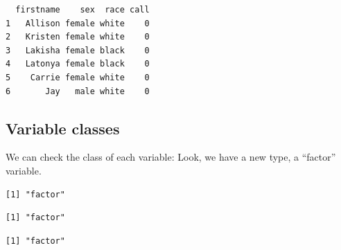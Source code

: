 \documentclass[
  letterpaper,
  DIV=11,
  numbers=noendperiod]{scrreprt}
\newenvironment{Shaded}{\begin{snugshade}}{\end{snugshade}}
\newcommand{\FunctionTok}[1]{\textcolor[rgb]{0.28,0.35,0.67}{#1}}
\newcommand{\NormalTok}[1]{\textcolor[rgb]{0.00,0.23,0.31}{#1}}
\newcommand{\SpecialCharTok}[1]{\textcolor[rgb]{0.37,0.37,0.37}{#1}}
\begin{document}
\begin{verbatim}
  firstname    sex  race call
1   Allison female white    0
2   Kristen female white    0
3   Lakisha female black    0
4   Latonya female black    0
5    Carrie female white    0
6       Jay   male white    0
\end{verbatim}

\hypertarget{variable-classes}{%
\subsection{Variable classes}\label{variable-classes}}

We can check the class of each variable: Look, we have a new type, a
``factor'' variable.

\begin{Shaded}
\end{Shaded}

\begin{verbatim}
[1] "factor"
\end{verbatim}

\begin{Shaded}
\end{Shaded}

\begin{verbatim}
[1] "factor"
\end{verbatim}

\begin{Shaded}
\end{Shaded}

\begin{verbatim}
[1] "factor"
\end{verbatim}

\begin{Shaded}
\end{Shaded}
\end{document}
